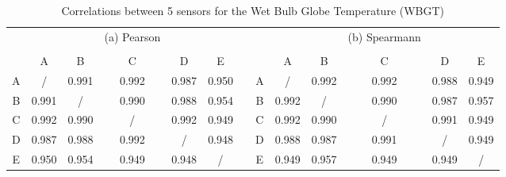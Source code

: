 \documentclass[a4paper]{article}
\begin{document}
\begin{table}[htbp]
  \centering
  \caption{Correlations between 5 sensors for the Wet Bulb Globe Temperature (WBGT)}
    \begin{tabular}{c|ccccccc|ccccc}
    \multicolumn{1}{c}{} &       &       & (a) Pearson &       &       &       & \multicolumn{1}{c}{} &       &       & (b) Spearmann &       &  \\
    \multicolumn{1}{c}{} &       &       &       &       &       &       & \multicolumn{1}{c}{} &       &       &       &       &  \\
          & A     & B     & C     & D     & E     &       &       & A     & B     & C     & D     & E \\
\cmidrule{1-6}\cmidrule{8-13}    A     & /     & 0.991  & 0.992  & 0.987  & 0.950  &       & A     & /     & 0.992  & 0.992  & 0.988  & 0.949  \\
    B     & 0.991  & /     & 0.990  & 0.988  & 0.954  &       & B     & 0.992  & /     & 0.990  & 0.987  & 0.957  \\
    C     & 0.992  & 0.990  & /     & 0.992  & 0.949  &       & C     & 0.992  & 0.990  & /     & 0.991  & 0.949  \\
    D     & 0.987  & 0.988  & 0.992  & /     & 0.948  &       & D     & 0.988  & 0.987  & 0.991  & /     & 0.949  \\
    E     & 0.950  & 0.954  & 0.949  & 0.948  & /     &       & E     & 0.949  & 0.957  & 0.949  & 0.949  & / \\
    \end{tabular}%
\end{table}%
\end{document}
